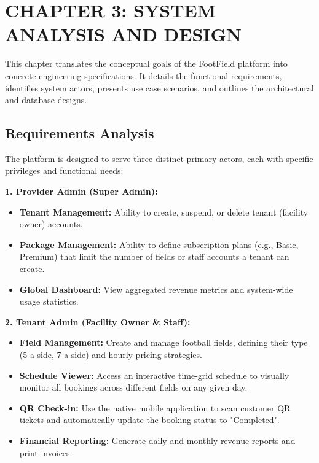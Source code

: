 \section*{CHAPTER 3: SYSTEM ANALYSIS AND DESIGN}
\setcounter{section}{3}
\setcounter{subsection}{0}
\setcounter{figure}{0}
\setcounter{table}{0}

This chapter translates the conceptual goals of the FootField platform into concrete engineering specifications. It details the functional requirements, identifies system actors, presents use case scenarios, and outlines the architectural and database designs.

\subsection{Requirements Analysis}
The platform is designed to serve three distinct primary actors, each with specific privileges and functional needs:

\textbf{1. Provider Admin (Super Admin):}
\begin{itemize}
    \item \textbf{Tenant Management:} Ability to create, suspend, or delete tenant (facility owner) accounts.
    \item \textbf{Package Management:} Ability to define subscription plans (e.g., Basic, Premium) that limit the number of fields or staff accounts a tenant can create.
    \item \textbf{Global Dashboard:} View aggregated revenue metrics and system-wide usage statistics.
\end{itemize}

\textbf{2. Tenant Admin (Facility Owner \& Staff):}
\begin{itemize}
    \item \textbf{Field Management:} Create and manage football fields, defining their type (5-a-side, 7-a-side) and hourly pricing strategies.
    \item \textbf{Schedule Viewer:} Access an interactive time-grid schedule to visually monitor all bookings across different fields on any given day.
    \item \textbf{QR Check-in:} Use the native mobile application to scan customer QR tickets and automatically update the booking status to "Completed".
    \item \textbf{Financial Reporting:} Generate daily and monthly revenue reports and print invoices.
\end{itemize}

